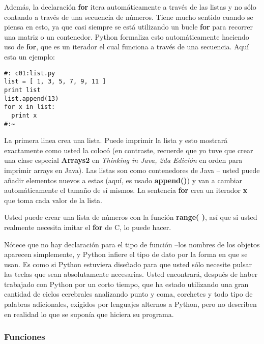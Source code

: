 
Además, la declaración \textbf{for} itera automáticamente a través de las listas y no sólo contando a través de una secuencia de números. Tiene mucho sentido cuando se piensa en esto, ya que casi siempre se está utilizando un bucle \textbf{for} para recorrer una matriz o un contenedor. Python formaliza esto automáticamente haciendo uso de \textbf{for}, que es un iterador el cual funciona a través de una secuencia.
Aquí esta un ejemplo:
\newline
 
\begin{lstlisting} 
#: c01:list.py 
list = [ 1, 3, 5, 7, 9, 11 ] 
print list 
list.append(13) 
for x in list: 
  print x 
#:~ 
\end{lstlisting}

La primera linea crea una lista. Puede imprimir la lista y esto mostrará exactamente como usted la colocó (en contraste, recuerde que yo tuve que crear una clase especial \textbf{Arrays2} en \textit{Thinking in Java, 2da Edición} en orden para imprimir arrays en Java).
Las listas son como contenedores de Java  – usted puede añadir elementos nuevos a estas (aquí, es usado \textbf{append()}) y van a cambiar automáticamente el tamaño de sí mismos.  La sentencia \textbf{for} crea un iterador \textbf{x} que toma cada valor de la lista.
\newline

Usted puede crear una lista de números con la función \textbf{range( )}, así que si usted realmente necesita imitar el \textbf{for} de C, lo puede hacer.\newline

Nótece que no hay declaración para el tipo de función –los nombres de los objetos aparecen simplemente, y Python infiere el tipo de dato por la forma en que se usan. Es como si Python estuviera diseñado para que usted sólo necesite pulsar las teclas que sean absolutamente necesarias. Usted encontrará, después de haber trabajado con Python por un corto tiempo, que ha estado utilizando una gran cantidad de ciclos cerebrales analizando punto y coma, corchetes y todo tipo de palabras adicionales, exigidos por lenguajes alternos a Python, pero no describen en realidad lo que se suponía que hiciera su programa. 

\subsubsection*{Funciones}
\label{subsubsec:function}

